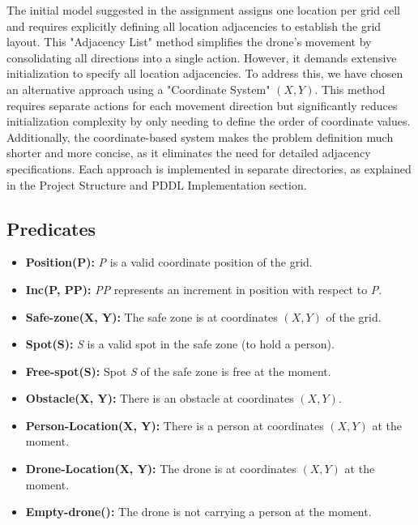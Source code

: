 \documentclass{article}
\begin{document}
\vspace{1em}

\begin{tcolorbox}[colback=gray!10, colframe=black, title=Adjacency List vs. Coordinate System Approaches]
    The initial model suggested in the assignment assigns one location per grid cell and requires explicitly defining all location adjacencies to establish the grid layout. This "Adjacency List" method simplifies the drone's movement by consolidating all directions into a single action. However, it demands extensive initialization to specify all location adjacencies. To address this, we have chosen an alternative approach using a "Coordinate System" \((X, Y)\). This method requires separate actions for each movement direction but significantly reduces initialization complexity by only needing to define the order of coordinate values. Additionally, the coordinate-based system makes the problem definition much shorter and more concise, as it eliminates the need for detailed adjacency specifications. Each approach is implemented in separate directories, as explained in the Project Structure and PDDL Implementation section.
\end{tcolorbox}

\subsection{Predicates}\label{sec:pred}

\begin{itemize}[label=--, itemsep=0.05em]
    \item \textbf{Position(P):} \textit{P} is a valid coordinate position of the grid.
    \item \textbf{Inc(P, PP):} \textit{PP} represents an increment in position with respect to \textit{P}.
    \item \textbf{Safe-zone(X, Y):} The safe zone is at coordinates \((X, Y)\) of the grid.
    \item \textbf{Spot(S):} \textit{S} is a valid spot in the safe zone (to hold a person).
    \item \textbf{Free-spot(S):} Spot \textit{S} of the safe zone is free at the moment.
    \item \textbf{Obstacle(X, Y):} There is an obstacle at coordinates \((X, Y)\).
    \item \textbf{Person-Location(X, Y):} There is a person at coordinates \((X, Y)\) at the moment.
    \item \textbf{Drone-Location(X, Y):} The drone is at coordinates \((X, Y)\) at the moment.
    \item \textbf{Empty-drone():} The drone is not carrying a person at the moment.
\end{itemize}
\end{document}

